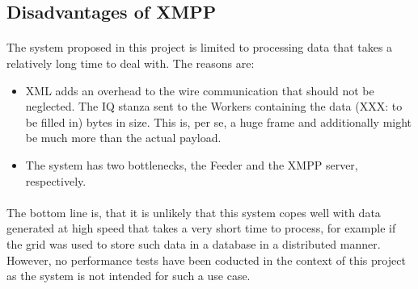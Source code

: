 \subsection{Disadvantages of XMPP}
\paragraph{}
The system proposed in this project is limited to processing data that takes a relatively long time to deal with. The reasons are:
\begin{itemize}
\item XML adds an overhead to the wire communication that should not be neglected. The IQ stanza sent to the Workers containing the data (XXX: to be filled in) bytes in size. This is, per se, a huge frame and additionally might be much more than the actual payload.
\item The system has two bottlenecks, the Feeder and the XMPP server, respectively.
\end{itemize}

\paragraph{}
The bottom line is, that it is unlikely that this system copes well with data generated at high speed that takes a very short time to process, for example if the grid was used to store such data in a database in a distributed manner. However, no performance tests have been coducted in the context of this project as the system is not intended for such a use case.

